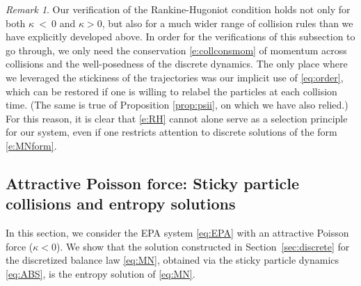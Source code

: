 \documentclass[11pt,reqno]{amsart}
\theoremstyle{definition}
\theoremstyle{remark}
\newtheorem{remark}{Remark}
\begin{document}
	\begin{remark}
		Our verification of the Rankine-Hugoniot condition holds not only for both $\kappa~<~0$ and $\kappa>0$, but also for a much wider range of collision rules than we have explicitly developed above.  In order for the verifications of this subsection to go through, we only need the conservation \eqref{e:collconsmom} of momentum across collisions and the well-posedness of the discrete dynamics. The only place where we leveraged the stickiness of the trajectories was our implicit use of \eqref{eq:order}, which can be restored if one is willing to relabel the particles at each collision time.  (The same is true of Proposition \ref{prop:psii}, on which we have also relied.)  
		For this reason, it is clear that \eqref{e:RH} cannot alone serve as a selection principle for our system, even if one restricts attention to discrete solutions of the form \eqref{e:MNform}.
	\end{remark}
	
	\subsection{Attractive Poisson force: Sticky particle collisions and entropy solutions}\label{sec:attractive}
	

	
	In this section, we consider the EPA system \eqref{eq:EPA} with an attractive Poisson force ($\kappa<0$). We show that the solution constructed in Section~\ref{sec:discrete} for the discretized balance law \eqref{eq:MN}, obtained via the sticky particle dynamics \eqref{eq:ABS}, is the entropy solution of \eqref{eq:MN}.
	
\end{document}

